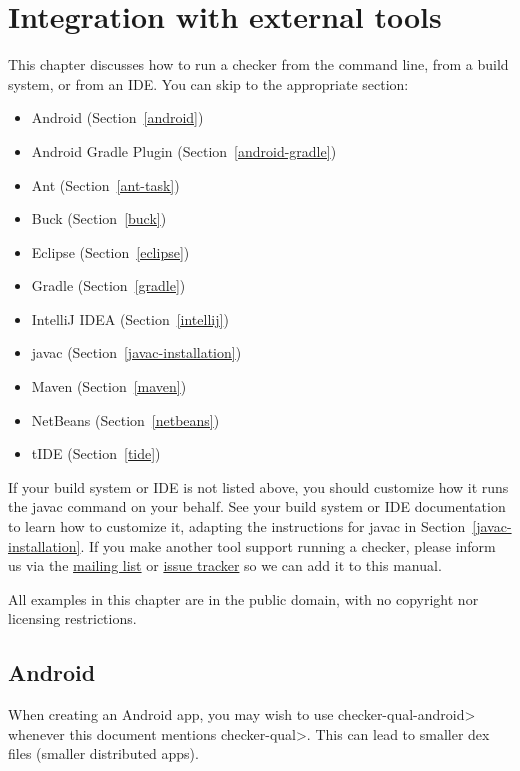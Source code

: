 \htmlhr
\chapter{Integration with external tools\label{external-tools}}

This chapter discusses how to run a checker from the command line, from a
build system, or from an IDE\@.  You can skip to the appropriate section:

\begin{itemize}
\item Android (Section~\ref{android})
\item Android Gradle Plugin (Section~\ref{android-gradle})
\item Ant (Section~\ref{ant-task})
\item Buck (Section~\ref{buck})
\item Eclipse (Section~\ref{eclipse})
\item Gradle (Section~\ref{gradle})
\item IntelliJ IDEA (Section~\ref{intellij})
\item javac (Section~\ref{javac-installation})
\item Maven (Section~\ref{maven})
\item NetBeans (Section~\ref{netbeans})
\item tIDE (Section~\ref{tide})
\end{itemize}

If your build system or IDE is not listed above, you should customize how
it runs the javac command on your behalf.  See your build system or IDE
documentation to learn how to
customize it, adapting the instructions for javac in Section~\ref{javac-installation}.
If you make another tool support running a checker, please
inform us via the
\href{https://groups.google.com/forum/#!forum/checker-framework-discuss}{mailing
  list} or
\href{https://github.com/typetools/checker-framework/issues}{issue tracker} so
we can add it to this manual.

All examples in this chapter are in the public domain, with no copyright nor
licensing restrictions.


\section{Android\label{android}}

When creating an Android app, you may wish to use \<checker-qual-android>
whenever this document mentions \<checker-qual>.  This can lead to smaller
dex files (smaller distributed apps).

